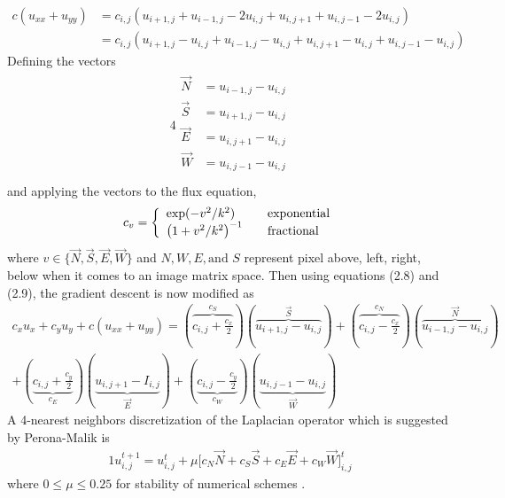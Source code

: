\documentclass[12pt]{report}
\begin{document}
\begin{tableofcontents}
\begin{equation}
\begin{split}
c(u_{xx} + u_{yy})
&= c_{i,j}(u_{i+1,j}+u_{i-1,j}-2u_{i,j}+u_{i,j+1}+u_{i,j-1}-2u_{i,j}) \\
&= c_{i,j}(u_{i+1,j}-u_{i,j}+u_{i-1,j}-u_{i,j}+u_{i,j+1}-u_{i,j}+u_{i,j-1}-u_{i,j})
			\end{split}
            \end{equation}
Defining the vectors
            \begin{alignat*}{4}
            \begin{split}
            \overrightarrow{N} &= u_{i-1,j} - u_{i,j} \\
            \overrightarrow{S} &= u_{i+1,j} - u_{i,j} \\
            \overrightarrow{E} &= u_{i,j+1} - u_{i,j} \\
            \overrightarrow{W} &= u_{i,j-1} - u_{i,j} \\
            \end{split}
            \end{alignat*}
and applying the vectors to the flux equation,
\[ c_{v} = \left\{
  \begin{array}{l l}
    \text{exp}(-v^{2}/k^{2}) & \quad \text{exponential}\\
    \big(1 + v^{2}/k^{2}\big)^{-1} & \quad \text{fractional}
  \end{array} \right.\]
where $v \in \{\overrightarrow{N}, \overrightarrow{S}, \overrightarrow{E}, \overrightarrow{W}\}$ and $N, W, E,\text{and } S$ represent pixel above, left, right, below when it comes to an image matrix space. Then using equations (2.8) and (2.9), the gradient descent is now modified as
			\begin{multline*}
c_{x}u_{x} + c_{y}u_{y} + c(u_{xx} + u_{yy})
= (\overbrace{c_{i,j}+\frac{c_{x}}{2}}^{c_{S}})(\overbrace{u_{i+1,j}-u_{i,j}}^{\overrightarrow{S}})
+ (\overbrace{c_{i,j}-\frac{c_{x}}{2}}^{c_{N}})(\overbrace{u_{i-1,j}-u_{i,j}}^{\overrightarrow{N}})\\
+ (\underbrace{c_{i,j}+\frac{c_{y}}{2}}_{c_{E}})(\underbrace{u_{i,j+1}-I_{i,j}}_{\overrightarrow{E}})
+ (\underbrace{c_{i,j}-\frac{c_{y}}{2}}_{c_{W}})(\underbrace{u_{i,j-1}-u_{i,j}}_{\overrightarrow{W}})
            \end{multline*}
A 4-nearest neighbors discretization of the Laplacian operator which is suggested by Perona-Malik is
			\begin{alignat*}{1}
u_{i,j}^{t+1} = u_{i,j}^{t} + \mu\Big[c_{N}\overrightarrow{N}
			+c_{S}\overrightarrow{S}
            +c_{E}\overrightarrow{E}
            +c_{W}\overrightarrow{W}\Big]_{i,j}^{t}
            \end{alignat*}
where $0 \leq \mu \leq 0.25$ for stability of numerical schemes \cite{perona1990scale}.

\end{tableofcontents}
\end{document}
